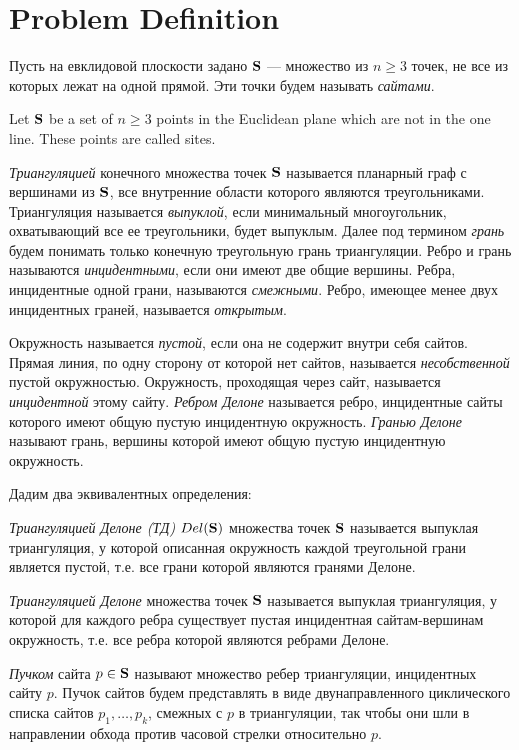 \documentclass[12pt]{article}
\begin{document}
\section{Problem Definition}
{\color{green} Пусть на евклидовой плоскости задано $\bf{S}$ --- множество из
$n \ge 3$ точек, не все из которых лежат на одной прямой.
Эти точки будем называть {\it сайтами}.
}

Let $\bf{S}$ be a set of $n \ge 3$ points in the Euclidean plane which are not in the one line.
These points are called sites.

{\it Триангуляцией} конечного множества точек $\bf{S}$ называется планарный граф с вершинами из $\bf{S}$,
все внутренние области которого являются треугольниками.
Триангуляция называется {\it выпуклой}, если минимальный многоугольник, охватывающий все ее треугольники, будет выпуклым.
Далее под термином {\it грань} будем понимать только конечную треугольную грань триангуляции.
Ребро и грань называются {\it инцидентными}, если они имеют две общие вершины.
Ребра, инцидентные одной грани, называются {\it смежными}.
Ребро, имеющее менее двух инцидентных граней, называется {\it открытым}.

Окружность называется {\it пустой}, если она не содержит внутри себя сайтов.
Прямая линия, по одну сторону от которой нет сайтов, называется {\it несобственной} пустой окружностью.
Окружность, проходящая через сайт, называется {\it инцидентной} этому сайту.
{\it Ребром Делоне} называется ребро, инцидентные сайты которого имеют общую пустую инцидентную окружность.
{\it Гранью Делоне} называют грань, вершины которой имеют общую пустую инцидентную окружность.

Дадим два эквивалентных определения:

\begin{definition}
{\it Триангуляцией Делоне (ТД) $Del(\bf{S})$} множества точек $\bf{S}$ называется выпуклая триангуляция,
у которой описанная окружность каждой треугольной грани является пустой,
т.е. все грани которой являются гранями Делоне.
\end{definition}

\begin{definition}
{\it Триангуляцией Делоне} множества точек $\bf{S}$ называется выпуклая триангуляция,
у которой для каждого ребра существует пустая инцидентная сайтам-вершинам окружность,
т.е. все ребра которой являются ребрами Делоне.
\end{definition}

{\it Пучком} сайта $p \in \bf{S}$ называют множество ребер триангуляции, инцидентных сайту $p$.
Пучок сайтов будем представлять в виде двунаправленного циклического списка сайтов $p_1, \ldots, p_k$,
смежных с $p$ в триангуляции, так чтобы они шли в направлении обхода против часовой стрелки относительно $p$.
\end{document}
